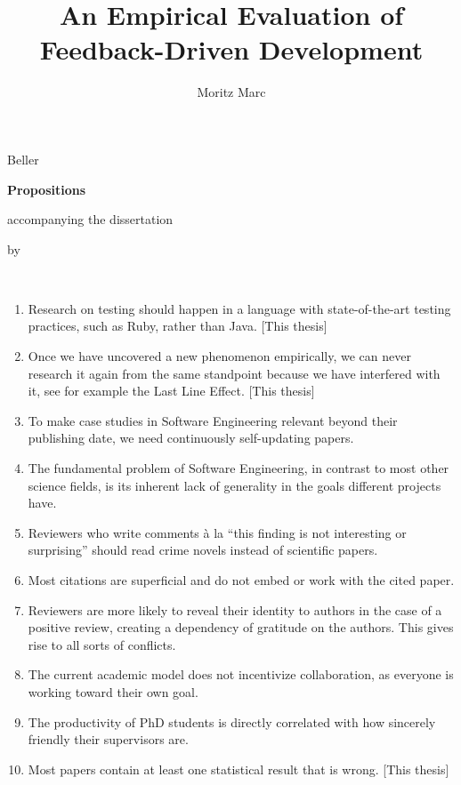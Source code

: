 \documentclass{dissertation}
\begin{document}
\title{An Empirical Evaluation of Feedback-Driven Development}
\author{Moritz Marc}{Beller}

\begin{center}

{\Large\titlefont\bfseries Propositions}

\bigskip

accompanying the dissertation

\bigskip

{\makeatletter
\titlestyle\bfseries\large\@title
\makeatother}

{\makeatletter
\ifx\@subtitle\undefined\else
    \titlefont\titleshape\@subtitle
\fi
\makeatother}

\bigskip

by

\bigskip

\makeatletter
{\large\titlefont\bfseries\@firstname\ {\titleshape\@lastname}}
\makeatother

\end{center}

\bigskip
\bigskip

\begin{enumerate}
\item Research on testing should happen in a language with state-of-the-art testing practices, such
  as Ruby, rather than Java. [This thesis]
\item Once we have uncovered a new phenomenon empirically, we can never research it again from the
  same standpoint because we have interfered with it, see for example the Last Line Effect. [This
    thesis]
\item To make case studies in Software Engineering relevant beyond their publishing date, we need
  continuously self-updating papers.
\item The fundamental problem of Software Engineering, in contrast to most other science
  fields, is its inherent lack of generality in the goals different projects have.
\item Reviewers who write comments à la ``this finding is not interesting or
  surprising'' should read crime novels instead of scientific papers.
\item Most citations are superficial and do not embed or work with the cited paper.
\item Reviewers are more likely to reveal their identity to authors in the case of a positive
  review, creating a dependency of gratitude on the authors. This gives rise to all sorts of
  conflicts.
\item The current academic model does not incentivize collaboration, as everyone is working toward
  their own goal.
\item The productivity of PhD students is directly correlated with how sincerely friendly their
  supervisors are.
\item Most papers contain at least one statistical result that is wrong. [This thesis]
\end{enumerate}
\end{document}
